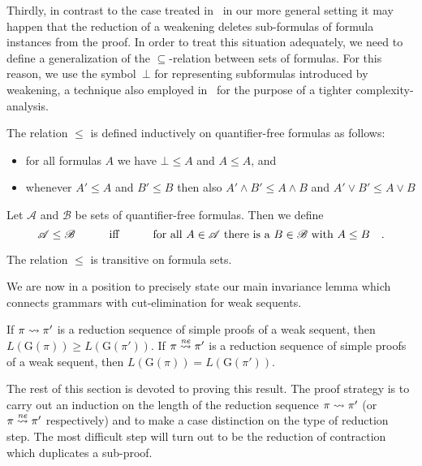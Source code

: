 \documentclass{LMCS}
\theoremstyle{plain}
\theoremstyle{definition}
\def\cA{{\mathcal A}}
\def\cB{{\mathcal B}}
\newcommand{\Lang}[1]{L(#1)}	\newcommand{\Gram}[1]{\mathrm{G}(#1)}	\newcommand{\Gramreg}[1]{\mathrm{G}_0(#1)}
\newcommand{\Hsub}{\le}
\newcommand{\Hsup}{\ge}
\begin{document}
Thirdly, in contrast to the case treated in~\cite{Hetzl12Herbrand} in
our more general setting it may happen that the reduction of a
weakening deletes sub-formulas of formula instances from the proof. In
order to treat this situation adequately, we need to define a
generalization of the $\subseteq$-relation between sets of
formulas. For this reason, we use the symbol~$\bot$ for representing
subformulas introduced by weakening, a technique also employed
in~\cite{Baaz12Complexity,Weller11Elimination} for the purpose of a
tighter complexity-analysis.

\begin{defi}
  The relation $\Hsub$ is defined inductively on quantifier-free
  formulas as follows:
  \begin{itemize}
  \item for all formulas $A$ we have $\bot\Hsub A$ and $A\Hsub A$, and
  \item whenever $A'\Hsub A$ and $B'\Hsub B$ then also 
    $A'\land B'\Hsub A\land B$ and $A'\lor B'\Hsub A\lor B$
  \end{itemize}
Let $\cA$ and $\cB$ be sets of quantifier-free
  formulas. Then we define 
  \begin{equation*}
    \cA\Hsub\cB \qqquiff \text{for all $A\in\cA$ there
      is a $B\in\cB$ with $A\Hsub B$}\quad.    
  \end{equation*}
\end{defi}

\begin{fact}
  The relation $\Hsub$ is transitive on formula sets.
\end{fact}

We are now in a position to precisely state our main invariance lemma which
connects grammars with cut-elimination for weak sequents.

\begin{lem}\label{lem.inv_weak}
If $\pi\rightsquigarrow \pi'$ is a reduction sequence of simple proofs of a weak sequent, then
$\Lang{\Gram{\pi}}\Hsup \Lang{\Gram{\pi'}}$.
If $\pi\stackrel{\mathit{ne}}{\rightsquigarrow} \pi'$ is a reduction sequence of simple proofs of a weak sequent,
then $\Lang{\Gram{\pi}}=\Lang{\Gram{\pi'}}$.
\end{lem}

The rest of this section is devoted to proving this result. The proof strategy
is to carry out an induction on the length of the reduction sequence
$\pi\rightsquigarrow \pi'$ (or $\pi\stackrel{\mathit{ne}}{\rightsquigarrow} \pi'$ respectively) and to make a case distinction
on the type of reduction step. The most difficult step will turn out to be
the reduction of contraction which duplicates a sub-proof.
\end{document}
